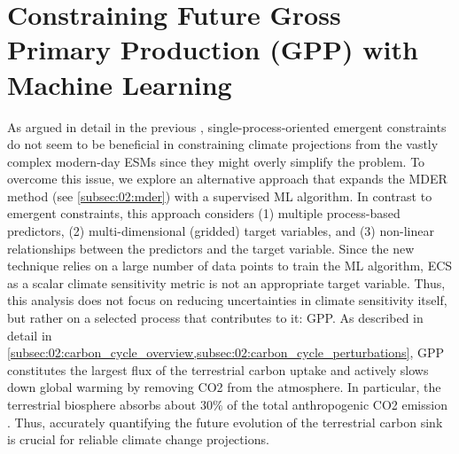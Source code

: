 
%



\chapter{Constraining Future Gross Primary Production (\acs{GPP}) with Machine
  Learning}
\label{ch:06:paper_gpp}

As argued in detail in the previous ,
single-process-oriented emergent constraints do not seem to be beneficial in
constraining climate projections from the vastly complex modern-day \acp{ESM}
since they might overly simplify the problem. To overcome this issue, we
explore an alternative approach that expands the \acf{MDER} method (see
\cref{subsec:02:mder}) with a supervised \acf{ML} algorithm. In contrast to
emergent constraints, this approach considers (1) multiple process-based
predictors, (2) multi-dimensional (gridded) target variables, and (3)
non-linear relationships between the predictors and the target variable. Since
the new technique relies on a large number of data points to train the \ac{ML}
algorithm, \ac{ECS} as a scalar climate sensitivity metric is not an
appropriate target variable. Thus, this analysis does not focus on reducing
uncertainties in climate sensitivity itself, but rather on a selected process
that contributes to it: \ac{GPP}. As described in detail in
\cref{subsec:02:carbon_cycle_overview,subsec:02:carbon_cycle_perturbations},
\ac{GPP} constitutes the largest flux of the terrestrial carbon uptake and
actively slows down global warming by removing \ac{CO2} from the atmosphere. In
particular, the terrestrial biosphere absorbs about $30 \unit{\%}$ of the total
anthropogenic \ac{CO2} emission \autocite{Friedlingstein2020}. Thus, accurately
quantifying the future evolution of the terrestrial carbon sink is crucial for
reliable climate change projections.

